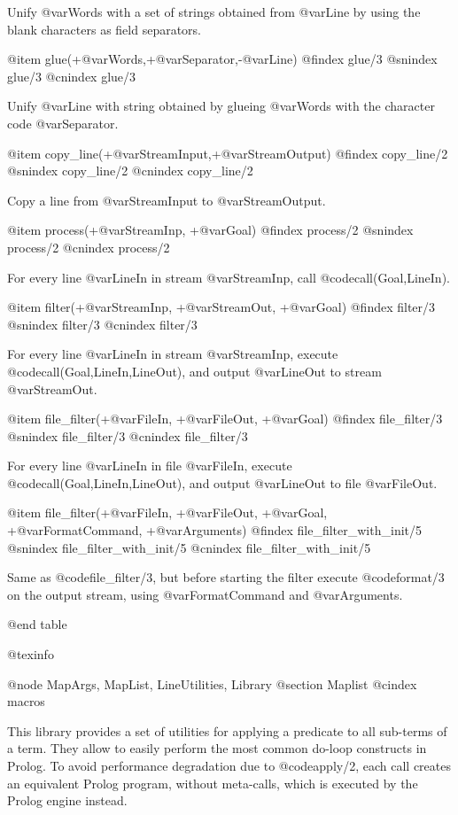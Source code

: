 Unify @var{Words} with a set of strings obtained from @var{Line} by
using the blank characters  as field separators.

@item glue(+@var{Words},+@var{Separator},-@var{Line})
@findex glue/3
@snindex glue/3
@cnindex glue/3

Unify @var{Line} with  string obtained by glueing @var{Words} with
the character code @var{Separator}.

@item copy_line(+@var{StreamInput},+@var{StreamOutput})
@findex copy_line/2
@snindex copy_line/2
@cnindex copy_line/2

Copy a line from @var{StreamInput} to @var{StreamOutput}.

@item process(+@var{StreamInp}, +@var{Goal})
@findex process/2
@snindex process/2
@cnindex process/2

For every line @var{LineIn} in stream @var{StreamInp}, call
@code{call(Goal,LineIn)}.

@item filter(+@var{StreamInp}, +@var{StreamOut}, +@var{Goal})
@findex filter/3
@snindex filter/3
@cnindex filter/3

For every line @var{LineIn} in stream @var{StreamInp}, execute
@code{call(Goal,LineIn,LineOut)}, and output @var{LineOut} to
stream @var{StreamOut}.

@item file_filter(+@var{FileIn}, +@var{FileOut}, +@var{Goal})
@findex file_filter/3
@snindex file_filter/3
@cnindex file_filter/3

For every line @var{LineIn} in file @var{FileIn}, execute
@code{call(Goal,LineIn,LineOut)}, and output @var{LineOut} to file
@var{FileOut}.

@item file_filter(+@var{FileIn}, +@var{FileOut}, +@var{Goal},
+@var{FormatCommand},   +@var{Arguments})
@findex file_filter_with_init/5
@snindex file_filter_with_init/5
@cnindex file_filter_with_init/5

Same as @code{file_filter/3}, but before starting the filter execute
@code{format/3} on the output stream, using @var{FormatCommand} and
@var{Arguments}.

@end table


@texinfo


@node MapArgs, MapList, LineUtilities, Library
@section Maplist
@cindex macros

This library provides a set of utilities for applying a predicate to
all sub-terms of a term. They allow to
easily perform the most common do-loop constructs in Prolog. To avoid
performance degradation due to @code{apply/2}, each call creates an
equivalent Prolog program, without meta-calls, which is executed by
the Prolog engine instead. 

